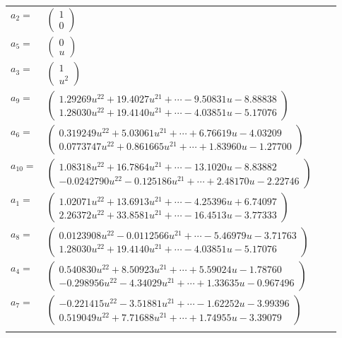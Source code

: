 \documentclass[1p]{elsarticle_modified}
\theoremstyle{definition}
\begin{document}
\begin{tabular}{m{7pt} m{180pt} m{7pt} m{180pt} }
\flushright $a_{2}=$&$\begin{pmatrix}1\\0\end{pmatrix}$ \\
\flushright $a_{5}=$&$\begin{pmatrix}0\\u\end{pmatrix}$ \\
\flushright $a_{3}=$&$\begin{pmatrix}1\\u^2\end{pmatrix}$ \\
\flushright $a_{9}=$&$\begin{pmatrix}1.29269 u^{22}+19.4027 u^{21}+\cdots-9.50831 u-8.88838\\1.28030 u^{22}+19.4140 u^{21}+\cdots-4.03851 u-5.17076\end{pmatrix}$ \\
\flushright $a_{6}=$&$\begin{pmatrix}0.319249 u^{22}+5.03061 u^{21}+\cdots+6.76619 u-4.03209\\0.0773747 u^{22}+0.861665 u^{21}+\cdots+1.83960 u-1.27700\end{pmatrix}$ \\
\flushright $a_{10}=$&$\begin{pmatrix}1.08318 u^{22}+16.7864 u^{21}+\cdots-13.1020 u-8.83882\\-0.0242790 u^{22}-0.125186 u^{21}+\cdots+2.48170 u-2.22746\end{pmatrix}$ \\
\flushright $a_{1}=$&$\begin{pmatrix}1.02071 u^{22}+13.6913 u^{21}+\cdots-4.25396 u+6.74097\\2.26372 u^{22}+33.8581 u^{21}+\cdots-16.4513 u-3.77333\end{pmatrix}$ \\
\flushright $a_{8}=$&$\begin{pmatrix}0.0123908 u^{22}-0.0112566 u^{21}+\cdots-5.46979 u-3.71763\\1.28030 u^{22}+19.4140 u^{21}+\cdots-4.03851 u-5.17076\end{pmatrix}$ \\
\flushright $a_{4}=$&$\begin{pmatrix}0.540830 u^{22}+8.50923 u^{21}+\cdots+5.59024 u-1.78760\\-0.298956 u^{22}-4.34029 u^{21}+\cdots+1.33635 u-0.967496\end{pmatrix}$ \\
\flushright $a_{7}=$&$\begin{pmatrix}-0.221415 u^{22}-3.51881 u^{21}+\cdots-1.62252 u-3.99396\\0.519049 u^{22}+7.71688 u^{21}+\cdots+1.74955 u-3.39079\end{pmatrix}$\\&\end{tabular}
\end{document}
